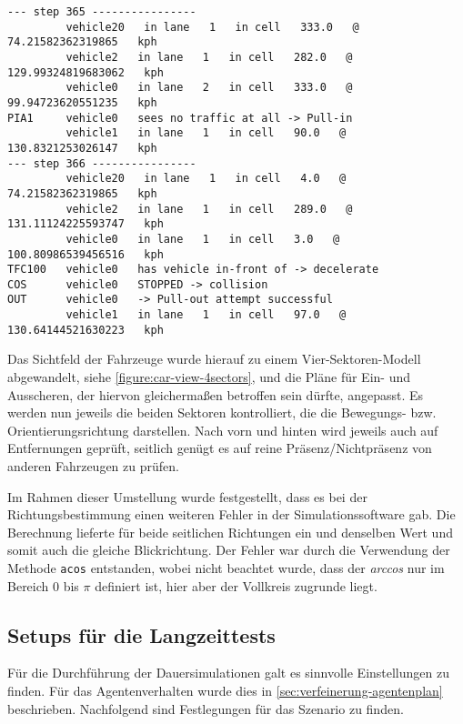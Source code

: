 \footnotesize\begin{verbatim}
--- step 365 ----------------
         vehicle20   in lane   1   in cell   333.0   @   74.21582362319865   kph
         vehicle2   in lane   1   in cell   282.0   @   129.99324819683062   kph
         vehicle0   in lane   2   in cell   333.0   @   99.94723620551235   kph
PIA1     vehicle0   sees no traffic at all -> Pull-in
         vehicle1   in lane   1   in cell   90.0   @   130.8321253026147   kph
--- step 366 ----------------
         vehicle20   in lane   1   in cell   4.0   @   74.21582362319865   kph
         vehicle2   in lane   1   in cell   289.0   @   131.11124225593747   kph
         vehicle0   in lane   1   in cell   3.0   @   100.80986539456516   kph
TFC100   vehicle0   has vehicle in-front of -> decelerate
COS      vehicle0   STOPPED -> collision
OUT      vehicle0   -> Pull-out attempt successful
         vehicle1   in lane   1   in cell   97.0   @   130.64144521630223   kph
\end{verbatim}
\normalsize

Das Sichtfeld der Fahrzeuge wurde hierauf zu einem Vier-Sektoren-Modell abgewandelt, siehe \cref{figure:car-view-4sectors}, und die Pläne für Ein- und Ausscheren, der hiervon gleichermaßen betroffen sein dürfte, angepasst.
Es werden nun jeweils die beiden Sektoren kontrolliert, die die Bewegungs- bzw. Orientierungsrichtung darstellen. 
Nach vorn und hinten wird jeweils auch auf Entfernungen geprüft, seitlich genügt es auf reine Präsenz/Nichtpräsenz von anderen Fahrzeugen zu prüfen.

Im Rahmen dieser Umstellung wurde festgestellt, dass es bei der Richtungsbestimmung einen weiteren Fehler in der Simulationssoftware gab.
Die Berechnung lieferte für beide seitlichen Richtungen ein und denselben Wert und somit auch die gleiche Blickrichtung.
Der Fehler war durch die Verwendung der Methode \texttt{acos} entstanden, wobei nicht beachtet wurde, dass der \textit{arccos} nur im Bereich 0 bis $ \pi $ definiert ist, hier aber der Vollkreis zugrunde liegt.





\subsection{Setups für die Langzeittests}
\label{sec:setup-dauertests}

Für die Durchführung der Dauersimulationen galt es sinnvolle Einstellungen zu finden. 
Für das Agentenverhalten wurde dies in \cref{sec:verfeinerung-agentenplan} beschrieben. 
Nachfolgend sind Festlegungen für das Szenario zu finden.



